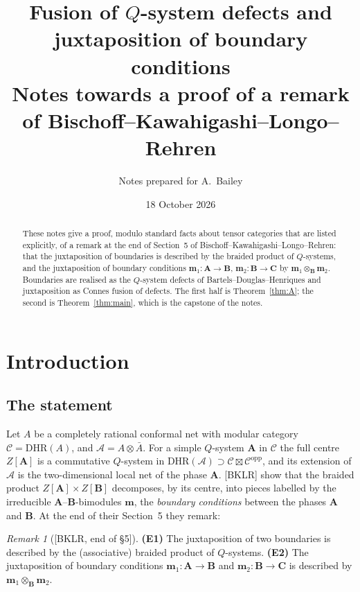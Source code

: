 \documentclass[11pt]{article}
\title{Fusion of $Q$-system defects and juxtaposition of boundary conditions\\[2pt]\large Notes towards a proof of a remark of Bischoff--Kawahigashi--Longo--Rehren}
\author{Notes prepared for A.~Bailey}
\date{18 October 2026}
\theoremstyle{definition}
\theoremstyle{remark}
\newtheorem{remark}[theorem]{Remark}
\newcommand{\cA}{\mathcal A}
\newcommand{\bfB}{\mathbf B}
\newcommand{\bfA}{\mathbf A}
\newcommand{\bfC}{\mathbf C}
\begin{document}
\maketitle

\begin{abstract}
\noindent These notes give a proof, modulo standard facts about tensor categories that are listed explicitly, of a remark at the end of Section~5 of Bischoff--Kawahigashi--Longo--Rehren: that the juxtaposition of boundaries is described by the braided product of $Q$-systems, and the juxtaposition of boundary conditions $\mathbf m_1\colon\bfA\to\bfB$, $\mathbf m_2\colon\bfB\to\bfC$ by $\mathbf m_1\otimes_{\bfB}\mathbf m_2$. Boundaries are realised as the $Q$-system defects of Bartels--Douglas--Henriques and juxtaposition as Connes fusion of defects. The first half is Theorem~\ref{thm:A}; the second is Theorem~\ref{thm:main}, which is the capstone of the notes.
\end{abstract}

\tableofcontents

\section{Introduction}\label{sec:intro}
\subsection{The statement}
Let $A$ be a completely rational conformal net with modular category $\mathcal C=\mathrm{DHR}(A)$, and $\cA=A\otimes\bar A$. For a simple $Q$-system $\bfA$ in $\mathcal C$ the full centre $Z[\bfA]$ is a commutative $Q$-system in $\mathrm{DHR}(\cA)\supset\mathcal C\boxtimes\mathcal C^{\mathrm{opp}}$, and its extension of $\cA$ is the two-dimensional local net of the phase $\bfA$. [BKLR] show that the braided product $Z[\bfA]\times Z[\bfB]$ decomposes, by its centre, into pieces labelled by the irreducible $\bfA$--$\bfB$-bimodules $\mathbf m$, the \emph{boundary conditions} between the phases $\bfA$ and $\bfB$. At the end of their Section~5 they remark:

\begin{remark}[{[BKLR, end of \S5]}]\label{rem:outlook}
\textbf{(E1)} The juxtaposition of two boundaries is described by the (associative) braided product of $Q$-systems. \textbf{(E2)} The juxtaposition of boundary conditions $\mathbf m_1\colon\bfA\to\bfB$ and $\mathbf m_2\colon\bfB\to\bfC$ is described by $\mathbf m_1\otimes_{\bfB}\mathbf m_2$.
\end{remark}
\end{document}

